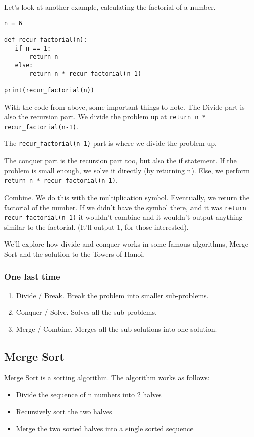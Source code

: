 \documentclass{article}
\newcommand{\code}[1]{\texttt{#1}}
\begin{document}
Let's look at another example, calculating the factorial of a number.
\begin{verbatim}
n = 6

def recur_factorial(n):
   if n == 1:
       return n
   else:
       return n * recur_factorial(n-1)

print(recur_factorial(n))
\end{verbatim}
With the code from above, some important things to note. The Divide part is also the recursion part. We divide the problem up at \code{return n * recur\_factorial(n-1)}.

The \code{recur\_factorial(n-1)} part is where we divide the problem up.

The conquer part is the recursion part too, but also the if statement. If the problem is small enough, we solve it directly (by returning n). Else, we perform \code{return n * recur\_factorial(n-1)}.

Combine. We do this with the multiplication symbol. Eventually, we return the factorial of the number. If we didn't have the symbol there, and it was \code{return recur\_factorial(n-1)} it wouldn't combine and it wouldn't output anything similar to the factorial. (It'll output 1, for those interested).

We'll explore how divide and conquer works in some famous algorithms, Merge Sort and the solution to the Towers of Hanoi.

\subsubsection{One last time}
\begin{enumerate}
    \item Divide / Break. Break the problem into smaller sub-problems.
    \item Conquer / Solve. Solves all the sub-problems.
    \item Merge / Combine. Merges all the sub-solutions into one solution.
\end{enumerate}
\newpage
\subsection{Merge Sort}

Merge Sort is a sorting algorithm. The algorithm works as follows:
\begin{itemize}
    \item Divide the sequence of n numbers into 2 halves
    \item Recursively sort the two halves
    \item Merge the two sorted halves into a single sorted sequence
\end{itemize}
\end{document}
